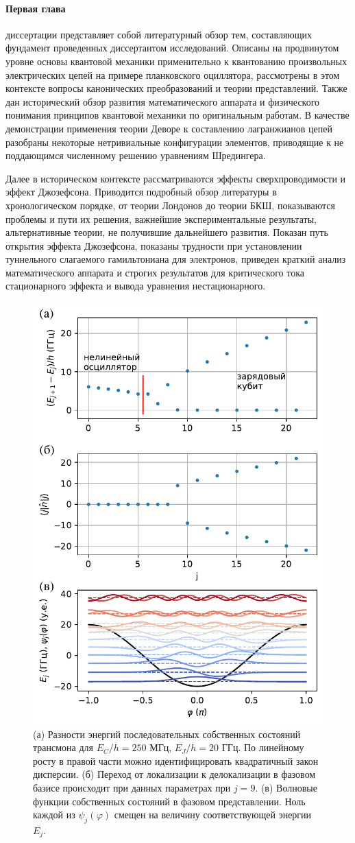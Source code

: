 \documentclass[14pt, a4paper]{extarticle}
\begin{document}
\paragraph{Первая глава} диссертации представляет собой литературный обзор тем, составляющих фундамент проведенных диссертантом исследований. Описаны на продвинутом уровне основы квантовой механики применительно к квантованию произвольных электрических цепей на примере планковского оциллятора, рассмотрены в этом контексте вопросы канонических преобразований и теории представлений. Также дан исторический обзор развития математического аппарата и физического понимания принципов квантовой механики по оригинальным работам. В качестве демонстрации применения теории Деворе к составлению лагранжианов цепей разобраны некоторые нетривиальные конфигурации элементов, приводящие к не поддающимся численному решению уравнениям Шредингера. 

Далее в историческом контексте рассматриваются эффекты сверхпроводимости и эффект Джозефсона. Приводится подробный обзор литературы в хронологическом порядке, от теории Лондонов до теории БКШ, показываются проблемы и пути их решения, важнейшие экспериментальные результаты, альтернативные теории, не получившие дальнейшего развития. Показан путь открытия эффекта Джозефсона, показаны трудности при установлении туннельного слагаемого гамильтониана для электронов, приведен краткий анализ математического аппарата и строгих результатов для критического тока стационарного эффекта и вывода уравнения нестационарного. 

\begin{figure}[t]
	\centering
	\includegraphics[width=0.6\linewidth]{Pictures/transmon_levels}
	\caption{(а) Разности энергий последовательных собственных состояний трансмона для $E_C/h = 250$ МГц, $E_J/h = 20$ ГГц. По линейному росту в правой части можно идентифицировать квадратичный закон дисперсии. (б) Переход от локализации к делокализации в фазовом базисе происходит при данных параметрах при $j=9$. (в) Волновые функции собственных состояний в фазовом представлении. Ноль каждой из $\psi_j(\varphi)$ смещен на величину соответствующей энергии $E_j$.}
	\label{fig:transmonlevels}
\end{figure}
\end{document}
